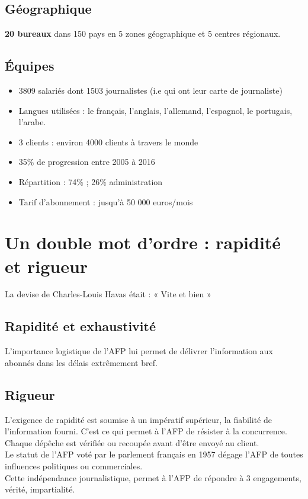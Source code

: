 \documentclass[a4paper,11pt]{report}
\begin{document}
\section{Géographique}
\textbf{20 bureaux} dans 150 pays en 5 zones géographique et 5 centres régionaux.
\section{Équipes}
\begin{itemize}
    \item 3809 salariés dont 1503 journalistes (i.e qui ont leur carte de journaliste)
    \item Langues utilisées : le français, l’anglais, l’allemand, l’espagnol, le portugais, l’arabe.
    \item 3 clients : environ 4000 clients à travers le monde
    \item 35\% de progression entre 2005 à 2016
    \item Répartition : 74\% ; 26\% administration
    \item Tarif d’abonnement : jusqu’à 50 000 euros/mois
\end{itemize}

\chapter{Un double mot d’ordre : rapidité et rigueur}
La devise de Charles-Louis Havas était : « Vite et bien »
\section{Rapidité et exhaustivité}
L’importance logistique de l’AFP lui permet de délivrer l’information aux abonnés dans les délais extrêmement bref.
\section{Rigueur}

L’exigence de rapidité est soumise à un impératif supérieur, la fiabilité de l’information fourni. C’est ce qui permet à l’AFP de résister à la concurrence.\\
Chaque dépêche est vérifiée ou recoupée avant d’être envoyé au client.\\
Le statut de l’AFP voté par le parlement français en 1957 dégage l’AFP de toutes influences politiques ou commerciales.\\
Cette indépendance journalistique, permet à l’AFP de répondre à 3 engagements, vérité, impartialité.\\
\end{document}
